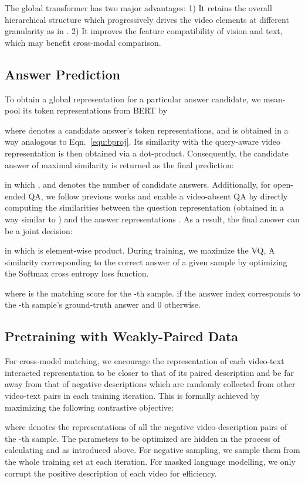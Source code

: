 \documentclass[runningheads]{llncs}
\begin{document}
The global transformer has two major advantages: 1) It retains the overall hierarchical structure which progressively drives the video elements at different granularity as in \cite{xiao2021video}. 2) It improves the feature compatibility of vision and text, which may benefit cross-modal comparison.

\subsection{Answer Prediction}
\label{sec:ad}
To obtain a global representation for a particular answer candidate, we mean-pool its token representations from BERT by 

where  denotes a candidate answer's token representations, and is obtained in a way analogous to Eqn.~\eqref{equ:bproj}. Its similarity with the query-aware video representation  is then obtained via a dot-product. Consequently, the candidate answer of maximal similarity is returned as the final prediction:

in which , and  denotes the number of candidate answers.
Additionally, for open-ended QA, we follow previous works \cite{xiao2021video} and enable a video-absent QA by directly computing the similarities between the question representation  (obtained in a way similar to ) and the answer representations . As a result, the final answer can be a joint decision: 

in which  is element-wise product. 
During training, we maximize the VQ, A similarity corresponding to the correct answer of a given sample by optimizing the Softmax cross entropy loss function.

where  is the matching score for the -th sample.  if the answer index corresponds to the -th sample's ground-truth answer and 0 otherwise.

\subsection{Pretraining with Weakly-Paired Data}
\label{sec:pt}
For cross-model matching, we encourage the representation of each video-text interacted representation  to be closer to that of its paired description  and be far away from that of negative descriptions which are randomly collected from other video-text pairs in each training iteration. This is formally achieved by maximizing the following contrastive objective:

where  denotes the representations of all the negative video-description pairs of the -th sample. The parameters to be optimized are hidden in the process of calculating  and  as introduced above. For negative sampling, we sample them from the whole training set at each iteration. For masked language modelling, we only corrupt the positive description of each video for efficiency.
\end{document}
